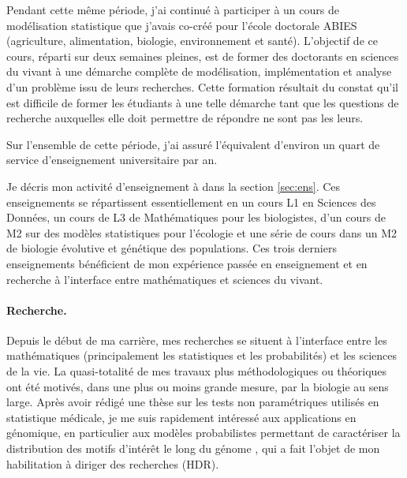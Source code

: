 Pendant cette même période, j’ai continué à participer à un cours de modélisation statistique que j’avais co-créé pour l’école doctorale ABIES (agriculture, alimentation, biologie, environnement et santé). L’objectif de ce cours, réparti sur deux semaines pleines, est de former des doctorants en sciences du vivant à une démarche complète de modélisation, implémentation et analyse d’un problème issu de leurs recherches. Cette formation résultait du constat qu’il est difficile de former les étudiants à une telle démarche tant que les questions de recherche auxquelles elle doit permettre de répondre ne sont pas les leurs. 

Sur l'ensemble de cette période, j'ai assuré l'équivalent d'environ un quart de service d'enseignement universitaire par an.

\bigskip
Je décris mon activité d’enseignement à \SU dans la section \ref{sec:ens}. Ces enseignements se répartissent essentiellement en un cours L1 en Sciences des Données, un cours de L3 de Mathématiques pour les biologistes, d’un cours de M2 sur des modèles statistiques pour l’écologie et une série de cours dans un M2 de biologie évolutive et génétique des populations. Ces trois derniers enseignements bénéficient de mon expérience passée en enseignement et en recherche à l’interface entre mathématiques et sciences du vivant.

\paragraph{Recherche.}
Depuis le début de ma carrière, mes recherches se situent à l'interface entre les mathématiques (principalement les statistiques et les probabilités) et les sciences de la vie. La quasi-totalité de mes travaux plus méthodologiques ou théoriques ont été motivés, dans une plus ou moins grande mesure, par la biologie au sens large. Après avoir rédigé une thèse sur les tests non paramétriques utilisés en statistique médicale, je me suis rapidement intéressé aux applications en génomique, en particulier aux modèles probabilistes permettant de caractériser la distribution des motifs d'intérêt le long du génome \cite{RRS06}, qui a fait l'objet de mon habilitation à diriger des recherches (HDR). 

